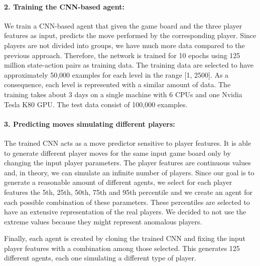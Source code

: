 \paragraph{2. Training the \acs{CNN}-based agent:}
We train a \acs{CNN}-based agent that given the game board and the three player features as input, predicts the move performed by the corresponding player. Since players are not divided into groups, we have much more data compared to the previous approach. Therefore, the network is trained for 10 epochs using 125 million state-action pairs as training data. The training data are selected to have approximately 50,000 examples for each level in the range [1, 2500]. As a consequence, each level is represented with a similar amount of data. The training takes about 3 days on a single machine with 6 CPUs and one Nvidia Tesla K80 GPU. The test data consist of 100,000 examples.

\paragraph{3. Predicting moves simulating different players:}
The trained \acs{CNN} acts as a move predictor sensitive to player features. It is able to generate different player moves for the same input game board only by changing the input player parameters. The player features are continuous values and, in theory, we can simulate an infinite number of players. Since our goal is to generate a reasonable amount of different agents, we select for each player features the 5th, 25th, 50th, 75th and 95th percentile and we create an agent for each possible combination of these parameters. These percentiles are selected to have an extensive representation of the real players. We decided to not use the extreme values because they might represent anomalous players. 

Finally, each agent is created by cloning the trained \acs{CNN} and fixing the input player features with a combination among those selected. This generates 125 different agents, each one simulating a different type of player.

